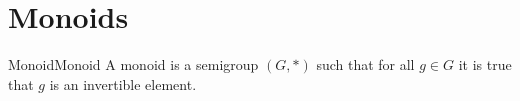 \section{Monoids}
    \begin{fdefinition}{Monoid}{Monoid}
        A \gls{monoid} is a \gls{semigroup} $(G,*)$ such that for all $g\in{G}$
        it is true that $g$ is an \gls{invertible element}.
    \end{fdefinition}